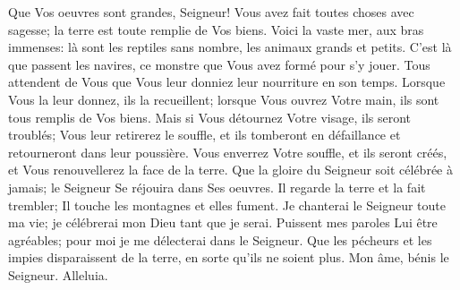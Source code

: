 {\VERSE Que Vos oeuvres sont grandes, Seigneur! Vous avez fait toutes choses avec sagesse; la terre est toute remplie de Vos biens. \EVERSE
\VERSE Voici la vaste mer, aux bras immenses: là sont les reptiles sans nombre, les animaux grands et petits.  \EVERSE
\VERSE C'est là que passent les navires, ce monstre que Vous avez formé pour s'y jouer.  \EVERSE
\VERSE Tous attendent de Vous que Vous leur donniez leur nourriture en son temps. \EVERSE
\VERSE Lorsque Vous la leur donnez, ils la recueillent; lorsque Vous ouvrez Votre main, ils sont tous remplis de Vos biens. \EVERSE
\VERSE Mais si Vous détournez Votre visage, ils seront troublés; Vous leur retirerez le souffle, et ils tomberont en défaillance et retourneront dans leur poussière. \EVERSE
\VERSE Vous enverrez Votre souffle, et ils seront créés, et Vous renouvellerez la face de la terre. \EVERSE
\VERSE Que la gloire du Seigneur soit célébrée à jamais; le Seigneur Se réjouira dans Ses oeuvres. \EVERSE
\VERSE Il regarde la terre et la fait trembler; Il touche les montagnes et elles fument. \EVERSE
\VERSE Je chanterai le Seigneur toute ma vie; je célébrerai mon Dieu tant que je serai. \EVERSE
\VERSE Puissent mes paroles Lui être agréables; pour moi je me délecterai dans le Seigneur. \EVERSE
\VERSE Que les pécheurs et les impies disparaissent de la terre, en sorte qu'ils ne soient plus. Mon âme, bénis le Seigneur. Alleluia.

}
